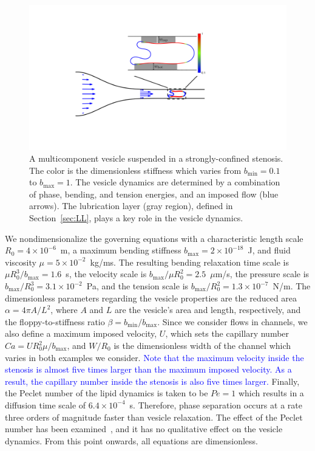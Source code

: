 \documentclass[twoside,twocolumn,9pt]{article}
\begin{document}
\begin{figure}[h]
  \centering
  \includegraphics[width=0.9\columnwidth]{figures/schematic.pdf}
  \caption{\label{fig:schematic}\small A multicomponent vesicle
  suspended in a strongly-confined stenosis. The color is the
  dimensionless stiffness which varies from $b_{\min} = 0.1$ to
  $b_{\max} = 1$. The vesicle dynamics are determined by a combination
  of phase, bending, and tension energies, and an imposed flow (blue
  arrows). The lubrication layer (gray region), defined in
  Section~\ref{sec:LL}, plays a key role in the vesicle dynamics.}
\end{figure}
We nondimensionalize the governing equations with a characteristic
length scale $R_0 = 4 \times 10^{-6}$~m, a maximum bending stiffness
$b_{\max} = 2 \times 10^{-18}$~J, and fluid viscosity $\mu = 5 \times
10^{-2}$~kg/ms. The resulting bending relaxation time scale is $\mu
R_0^3/b_{\max} = 1.6$~s, the velocity scale is
$b_{\max}/\mu R_0^2=2.5$~$\mu$m/s, the pressure scale is $b_{\max}/R_0^3
= 3.1 \times 10^{-2}$~Pa, and the tension scale is $b_{\max}/R_0^2 = 1.3
\times 10^{-7}$~N/m. The dimensionless parameters regarding the vesicle
properties are the reduced area $\alpha = 4\pi A/L^2$, where $A$ and $L$
are the vesicle's area and length, respectively, and the
floppy-to-stiffness ratio $\beta = b_{\min}/b_{\max}$. Since we consider
flows in channels, we also define a maximum imposed velocity, $U$, which
sets the capillary number $Ca = U R_0^{2} \mu/b_{\max}$, and $W/R_0$ is
the dimensionless width of the channel which varies in both examples we
consider. 
\textcolor{blue}{
Note that the maximum velocity inside the stenosis is almost five times
larger than the maximum imposed velocity. As a result, the capillary
number inside the stenosis is also five times larger.
}
Finally, the Peclet number of the lipid dynamics is taken to
be $Pe = 1$ which results in a diffusion time scale of $6.4 \times
10^{-4}$~s. Therefore, phase separation occurs at a rate three orders of
magnitude faster than vesicle relaxation. The effect of the Peclet
number has been examined~\cite{liu-mar-li-vee-low2017,
soh-tse-li-voi-low2010}, and it has no qualitative effect on the vesicle
dynamics. From this point onwards, all equations are dimensionless.
\end{document}
